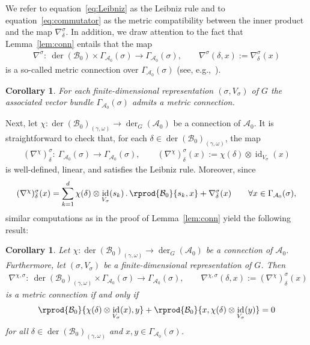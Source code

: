 \documentclass[pdftex]{sigma}
\numberwithin{equation}{section}
\newtheorem{Corollary}[Theorem]{Corollary}
\newcommand*{\tensor}{\otimes}		%
\DeclareMathOperator{\id}{id}		%
\DeclareMathOperator{\der}{der}
\newcommand*{\acts}{\,.\,}
\newcommand*{\alg}{\mathcal}		%
\newcommand*{\aA}{\alg{A}}			%
\newcommand*{\aB}{\alg{B}} 			%
\begin{document}
We refer to equation~\eqref{eq:Leibniz} as the Leibniz rule and to equation~\eqref{eq:commutator} as the metric compatibility between the inner product and the map $\nabla_\delta^\sigma$.
In addition, we draw attention to the fact that Lemma~\ref{lem:conn} entails that the map
\begin{gather*}
	\nabla^\sigma \colon \ \der(\aB_0) \times \Gamma_{\aA_0}(\sigma) \to \Gamma_{\aA_0}(\sigma), \qquad \nabla^\sigma(\delta,x) := \nabla_\delta^\sigma(x)
\end{gather*}
is a so-called metric connection over $\Gamma_{\aA_0}(\sigma)$ (see, e.g.,~\cite{Jo17,DuVio88}).

\begin{Corollary}
	For each finite-dimensional representation $(\sigma,V_\sigma)$ of $G$ the associated vector bundle $\Gamma_{\aA_0}(\sigma)$ admits a metric connection.
\end{Corollary}

Next, let $\chi\colon \der(\aB_0)_{(\gamma,\omega)} \to \der_G(\aA_0)$ be a connection of $\aA_0$.
It is straightforward to check that, for each $\delta \in \der(\aB_0)_{(\gamma,\omega)}$, the map
\begin{gather*}
	(\nabla^\chi)^\sigma_\delta \colon \ \Gamma_{\aA_0}(\sigma) \to \Gamma_{\aA_0}(\sigma),
	\qquad
	(\nabla^\chi)^\sigma_\delta(x) := \chi(\delta) \tensor \id_{V_\sigma}(x)
\end{gather*}
is well-defined, linear, and satisfies the Leibniz rule.
Moreover, since
\begin{gather*}
	(\nabla^\chi)^\sigma_\delta(x)
	=
	\sum_{k=1}^d \chi(\delta) \tensor \id_{V_\sigma}(s_k)\acts \rprod{\aB_0}{s_k,x} + \nabla^\sigma_\delta(x) \qquad \forall x \in \Gamma_{\aA_0}(\sigma),
\end{gather*}
similar computations as in the proof of Lemma~\ref{lem:conn} yield the following result:

\begin{Corollary}
	Let $\chi\colon \der(\aB_0)_{(\gamma,\omega)} \to \der_G(\aA_0)$ be a connection of $\aA_0$.
Furthermore, let $(\sigma,V_\sigma)$ be a finite-dimensional representation of $G$.
	Then
	\begin{gather*}
\nabla^{\chi,\sigma}\colon \ \der(\aB_0)_{(\gamma,\omega)} \times \Gamma_{\aA_0}(\sigma) \to \Gamma_{\aA_0}(\sigma),
		\qquad
\nabla^{\chi,\sigma}(\delta,x) := (\nabla^\chi)^\sigma_\delta(x)
\end{gather*}
	is a metric connection if and only if
	\begin{gather*}
		\rprod{\aB_0}{\chi(\delta) \tensor \id_{V_\sigma}(x),y} + \rprod{\aB_0}{x,\chi(\delta) \tensor \id_{V_\sigma}(y)} = 0
	\end{gather*}
	for all $\delta \in \der(\aB_0)_{(\gamma,\omega)}$ and $x,y \in \Gamma_{\aA_0}(\sigma)$.
\end{Corollary}
\end{document}
